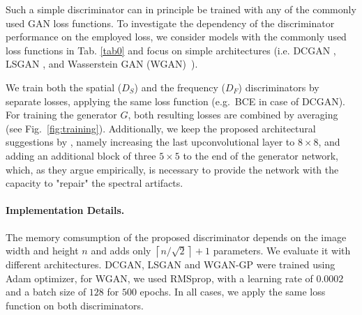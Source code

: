 \documentclass[letterpaper]{article} %
\begin{document}
Such a simple discriminator can in principle be trained with any of the commonly used GAN loss functions. To investigate the dependency of the discriminator performance on the employed loss, we consider models with the commonly used loss functions in Tab. \ref{tab0} and focus on simple architectures (i.e. DCGAN \cite{radford2015dcgan}, LSGAN \cite{mao2017least}, and Wasserstein GAN (WGAN)~\cite{gulrajani2017wgan,gulrajani2017improved}).

We train both the spatial ($D_S$) and the frequency ($D_F$) discriminators by separate losses, applying the same loss function (e.g.~BCE in case of DCGAN). For training the generator $G$, both resulting losses are combined by averaging (see Fig.~\ref{fig:training}). 
%
Additionally, we keep the proposed architectural suggestions by \cite{margret2020upconvolution}, namely increasing the last upconvolutional layer to $8 \times 8$, and adding an additional block of three $5 \times 5$ to the end of the generator network, which, as they argue empirically, is necessary to provide the network with the capacity to "repair" the spectral artifacts.  
\paragraph{Implementation Details.}
The memory comsumption of the proposed discriminator depends on the image width and height $n$ and adds only  $\left\lceil n/\sqrt{2} \right\rceil + 1$ parameters. We evaluate it with different architectures.
DCGAN, LSGAN and WGAN-GP were trained using Adam optimizer, for WGAN, we used RMSprop, with a learning rate of $0.0002$ and a batch size of $128$ for $500$ epochs. In all cases, we apply the same loss function on both discriminators.
\end{document}
